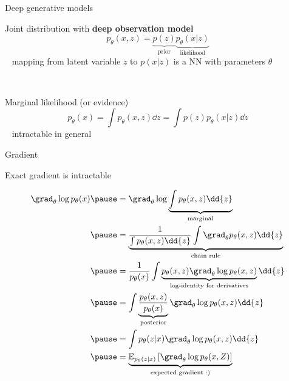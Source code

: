 \begin{frame}{Deep generative models}

Joint distribution with {\bf deep observation model}
\begin{equation*}
p_\theta(x, z) = \underbrace{p(z)}_{\text{prior}} \underbrace{p_\theta(x|z)}_{\text{likelihood}}
\end{equation*}
~ {\small mapping from latent variable $z$ to $p(x|z)$ is a NN with parameters $\theta$}

~ \pause

Marginal likelihood (or evidence)
\begin{equation*}
p_\theta(x) = \int p_\theta(x, z) \dd{z} = \int p(z)p_\theta(x|z) \dd{z} 
\end{equation*}
~ \alert{intractable} in general



\end{frame}

\begin{frame}[plain]{Gradient}

Exact gradient is intractable
\begin{small}
\begin{equation*}
\begin{aligned}
\grad_\theta \log p_\theta(x) \pause &= \grad_\theta \log \underbrace{\int p_\theta(x, z) \dd{z}}_{\text{marginal}} \\ \pause
&= \underbrace{\frac{1}{\int p_\theta(x, z) \dd{z}} \int \grad_\theta p_\theta(x,z) \dd{z}}_{\text{chain rule}} \\ \pause
&= \frac{1}{p_\theta(x)} \int \underbrace{p_\theta(x,z) \grad_\theta \log p_\theta(x,z)}_{\text{log-identity for derivatives}} \dd{z} \\ \pause
&= \int \underbrace{\frac{p_\theta(x,z)}{p_\theta(x)}}_{\text{posterior}} \grad_\theta \log p_\theta(x,z) \dd{z} \\ \pause
&= \int p_\theta(z|x) \grad_\theta \log p_\theta(x,z) \dd{z} \\ \pause
&= \underbrace{\mathbb E_{p_\theta(z|x)} \left[ \grad_\theta \log p_\theta(x,Z) \right]}_{\text{expected gradient :)}}
\end{aligned}
\end{equation*}
\end{small}



\end{frame}

